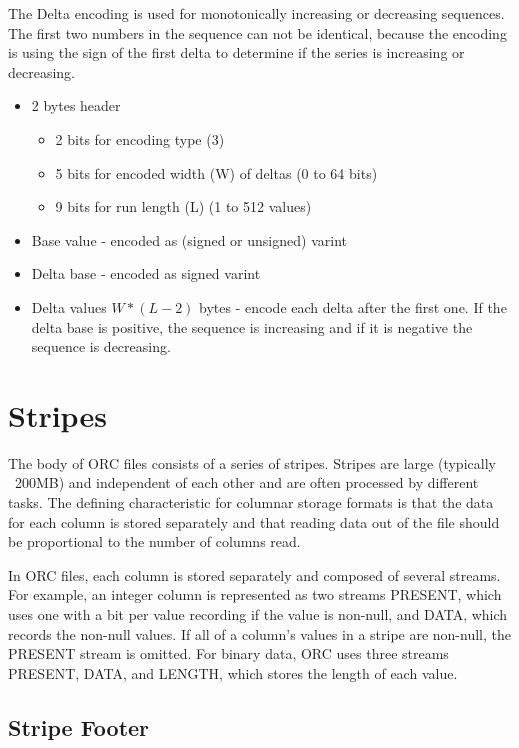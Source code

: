 \documentclass{article}
\begin{document}
The Delta encoding is used for monotonically increasing or decreasing
sequences. The first two numbers in the sequence can not be identical,
because the encoding is using the sign of the first delta to determine
if the series is increasing or decreasing.

\begin{itemize}
\item 2 bytes header
  \begin{itemize}
  \item 2 bits for encoding type (3)
  \item 5 bits for encoded width (W) of deltas (0 to 64 bits)
  \item 9 bits for run length (L) (1 to 512 values)
  \end{itemize}
\item Base value - encoded as (signed or unsigned) varint
\item Delta base - encoded as signed varint
\item Delta values $W * (L - 2)$ bytes - encode each delta after the first
  one. If the delta base is positive, the sequence is increasing and if it is
  negative the sequence is decreasing.
\end{itemize}

\section{Stripes}

The body of ORC files consists of a series of stripes. Stripes are
large (typically ~200MB) and independent of each other and are often
processed by different tasks. The defining characteristic for columnar
storage formats is that the data for each column is stored separately
and that reading data out of the file should be proportional to the
number of columns read.

In ORC files, each column is stored separately and composed of several
streams. For example, an integer column is represented as two streams
PRESENT, which uses one with a bit per value recording if the value is
non-null, and DATA, which records the non-null values. If all of a
column's values in a stripe are non-null, the PRESENT stream is
omitted. For binary data, ORC uses three streams PRESENT, DATA, and
LENGTH, which stores the length of each value.

\subsection{Stripe Footer}
\end{document}

